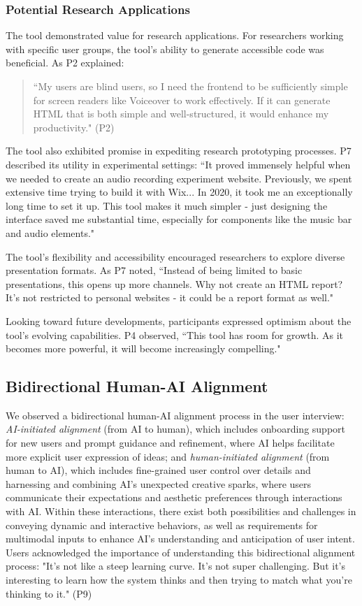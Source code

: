 \subsubsection{Potential Research Applications}
The tool demonstrated value for research applications. For researchers working with specific user groups, the tool's ability to generate accessible code was beneficial. As P2 explained:

\begin{quote}
``My users are blind users, so I need the frontend to be sufficiently simple for screen readers like Voiceover to work effectively. If it can generate HTML that is both simple and well-structured, it would enhance my productivity." (P2)
\end{quote}

The tool also exhibited promise in expediting research prototyping processes. P7 described its utility in experimental settings: ``It proved immensely helpful when we needed to create an audio recording experiment website. Previously, we spent extensive time trying to build it with Wix... In 2020, it took me an exceptionally long time to set it up. This tool makes it much simpler - just designing the interface saved me substantial time, especially for components like the music bar and audio elements."

The tool's flexibility and accessibility encouraged researchers to explore diverse presentation formats. As P7 noted, ``Instead of being limited to basic presentations, this opens up more channels. Why not create an HTML report? It's not restricted to personal websites - it could be a report format as well."

Looking toward future developments, participants expressed optimism about the tool's evolving capabilities. P4 observed, ``This tool has room for growth. As it becomes more powerful, it will become increasingly compelling."    

\subsection{Bidirectional Human-AI Alignment}

We observed a bidirectional human-AI alignment process in the user interview: \textit{AI-initiated alignment} (from AI to human), which includes onboarding support for new users and prompt guidance and refinement, where AI helps facilitate more explicit user expression of ideas; and \textit{human-initiated alignment} (from human to AI), which includes fine-grained user control over details and harnessing and combining AI's unexpected creative sparks, where users communicate their expectations and aesthetic preferences through interactions with AI. Within these interactions, there exist both possibilities and challenges in conveying dynamic and interactive behaviors, as well as requirements for multimodal inputs to enhance AI's understanding and anticipation of user intent. Users acknowledged the importance of understanding this bidirectional alignment process: "It's not like a steep learning curve. It's not super challenging. But it's interesting to learn how the system thinks and then trying to match what you're thinking to it." (P9)


